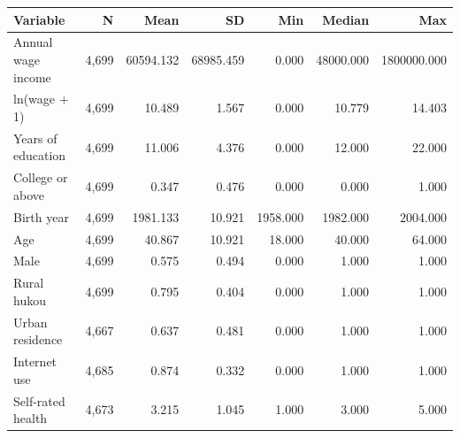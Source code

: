 \begin{tabular}{lrrrrrr}
\toprule
Variable & N & Mean & SD & Min & Median & Max \\
\midrule
Annual wage income & 4,699 & 60594.132 & 68985.459 & 0.000 & 48000.000 & 1800000.000 \\
ln(wage + 1) & 4,699 & 10.489 & 1.567 & 0.000 & 10.779 & 14.403 \\
Years of education & 4,699 & 11.006 & 4.376 & 0.000 & 12.000 & 22.000 \\
College or above & 4,699 & 0.347 & 0.476 & 0.000 & 0.000 & 1.000 \\
Birth year & 4,699 & 1981.133 & 10.921 & 1958.000 & 1982.000 & 2004.000 \\
Age & 4,699 & 40.867 & 10.921 & 18.000 & 40.000 & 64.000 \\
Male & 4,699 & 0.575 & 0.494 & 0.000 & 1.000 & 1.000 \\
Rural hukou & 4,699 & 0.795 & 0.404 & 0.000 & 1.000 & 1.000 \\
Urban residence & 4,667 & 0.637 & 0.481 & 0.000 & 1.000 & 1.000 \\
Internet use & 4,685 & 0.874 & 0.332 & 0.000 & 1.000 & 1.000 \\
Self-rated health & 4,673 & 3.215 & 1.045 & 1.000 & 3.000 & 5.000 \\
\bottomrule
\end{tabular}

